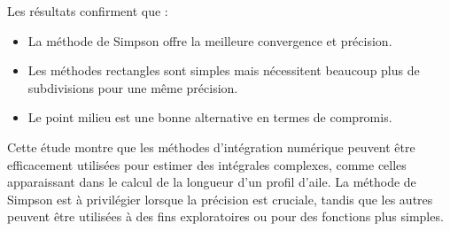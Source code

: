 Les résultats confirment que :
\begin{itemize}
    \item La méthode de Simpson offre la meilleure convergence et précision.
    \item Les méthodes rectangles sont simples mais nécessitent beaucoup plus de subdivisions pour une même précision.
    \item Le point milieu est une bonne alternative en termes de compromis.
\end{itemize}


Cette étude montre que les méthodes d'intégration numérique peuvent être efficacement utilisées pour estimer des intégrales complexes, comme celles apparaissant dans le calcul de la longueur d’un profil d’aile. La méthode de Simpson est à privilégier lorsque la précision est cruciale, tandis que les autres peuvent être utilisées à des fins exploratoires ou pour des fonctions plus simples.

